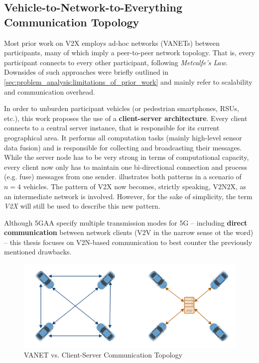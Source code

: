 \subsection{Vehicle-to-Network-to-Everything Communication Topology}
\label{subsec:concept_design:communication_topology}
Most prior work on V2X employs ad-hoc networks (VANETs) between participants, many of which imply a peer-to-peer network topology. That is, every participant connects to every other participant, following \textit{Metcalfe's Law}. Downsides of such approaches were briefly outlined in \cref{sec:problem_analysis:limitations_of_prior_work} and mainly refer to scalability and communication overhead.

In order to unburden participant vehicles (or pedestrian smartphones, RSUs, etc.), this work proposes the use of a \textbf{client-server architecture}. Every client connects to a central server instance, that is responsible for its current geographical area. It performs all computation tasks (mainly high-level sensor data fusion) and is responsible for collecting and broadcasting their messages. While the server node has to be very strong in terms of computational capacity, every client now only has to maintain one bi-directional connection and process (e.g. fuse) messages from one sender.  illustrates both patterns in a scenario of $n = 4$ vehicles. The pattern of V2X now becomes, strictly speaking, V2N2X, as an intermediate network is involved. However, for the sake of simplicity, the term \textit{V2X} will still be used to describe this new pattern. 

Although 5GAA specify multiple transmission modes for 5G \cite{5GAutomotiveAssociation2016} – including \textbf{direct communication} between network clients (V2V in the narrow sense ot the word) – this thesis focuses on V2N-based communication to best counter the previously mentioned drawbacks. 

\begin{figure}[h]
	\centering
	\includegraphics[width=0.9\linewidth]{98_images/topology_comparison}
	\caption{VANET vs. Client-Server Communication Topology}
	\label{fig:communication_topology}
\end{figure}


